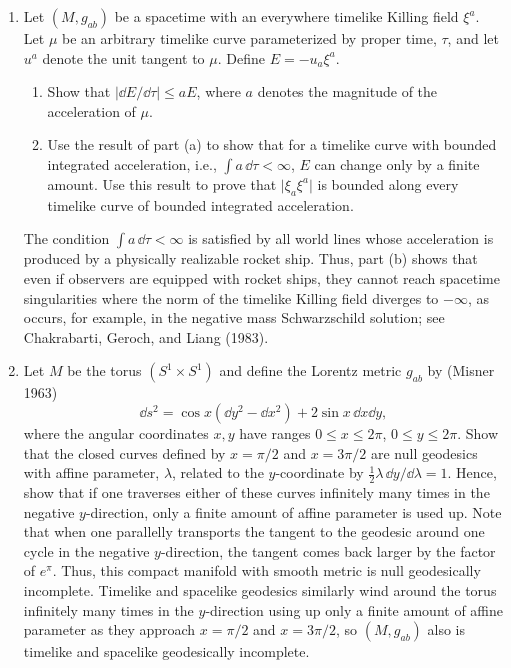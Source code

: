 
\chapterproblems

\begin{enumerate}[label=\arabic*.,leftmargin=*]
\item Let \((M,g_{ab})\) be a spacetime with an everywhere timelike Killing field
\(\xi^a\). Let \(\mu\) be an arbitrary timelike curve parameterized by proper time,
\(\tau\), and let \(u^a\) denote the unit tangent to \(\mu\). Define
\(E=-u_a\xi^a\).
  \begin{enumerate}[label=\alph*),leftmargin=2em]
  \item Show that \(\lvert\dd E/\dd\tau\rvert\leq aE\), where \(a\) denotes the
  magnitude of the acceleration of \(\mu\).

  \item Use the result of part (a) to show that for a timelike curve with bounded
  integrated acceleration, i.e., \(\int a\,\dd\tau<\infty\), \(E\) can change only by
  a finite amount. Use this result to prove that \(\lvert\xi_a\xi^a\rvert\) is bounded
  along every timelike curve of bounded integrated acceleration.
  \end{enumerate}

The condition \(\int a\,\dd\tau<\infty\) is satisfied by all world lines whose
acceleration is produced by a physically realizable rocket ship. Thus, part (b) shows
that even if observers are equipped with rocket ships, they cannot reach spacetime
singularities where the norm of the timelike Killing field diverges to \(-\infty\), as
occurs, for example, in the negative mass Schwarzschild solution; see Chakrabarti,
Geroch, and Liang (1983).

\item Let \(M\) be the torus \((S^1\times S^1)\) and define the Lorentz metric
\(g_{ab}\) by (Misner 1963)
\[
  \dd s^2=\cos x(\dd y^2-\dd x^2)+2\sin x\,\dd x\dd y ,
\]
where the angular coordinates \(x,y\) have ranges \(0\leq x\leq2\pi\),
\(0\leq y\leq2\pi\). Show that the closed curves defined by \(x=\pi/2\) and
\(x=3\pi/2\) are null geodesics with affine parameter, \(\lambda\), related to the
\(y\)-coordinate by \(\tfrac12\lambda\,\dd y/\dd\lambda=1\). Hence, show that if
one traverses either of these curves infinitely many times in the negative
\(y\)-direction, only a finite amount of affine parameter is used up. Note that when
one parallelly transports the tangent to the geodesic around one cycle in the negative
\(y\)-direction, the tangent comes back larger by the factor of \(e^\pi\). Thus, this
compact manifold with smooth metric is null geodesically incomplete. Timelike and
spacelike geodesics similarly wind around the torus infinitely many times in the
\(y\)-direction using up only a finite amount of affine parameter as they approach
\(x=\pi/2\) and \(x=3\pi/2\), so \((M,g_{ab})\) also is timelike and spacelike
geodesically incomplete.


\end{enumerate}
